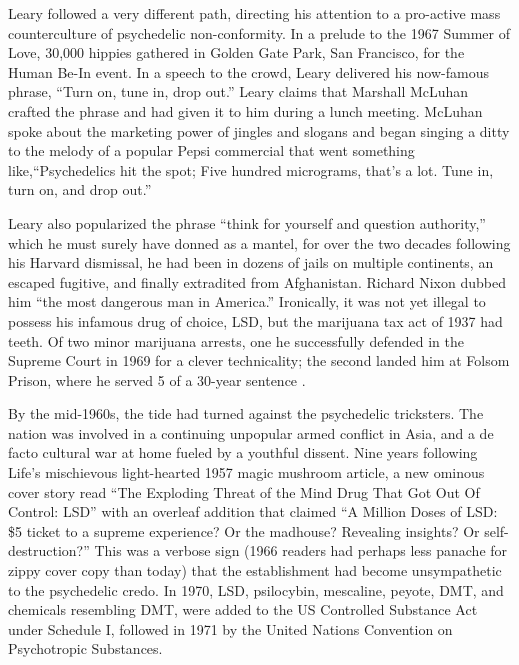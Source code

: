 \documentclass{UIdahoMastersThesis}
\begin{document}
Leary followed a very different path, directing his attention to a pro-active mass counterculture of psychedelic non-conformity. In a prelude to the 1967 Summer of Love, 30,000 hippies gathered in Golden Gate Park, San Francisco, for the Human Be-In event. In a speech to the crowd, Leary delivered his now-famous phrase, ``Turn on, tune in, drop out.'' Leary claims that Marshall McLuhan crafted the phrase and had given it to him during a lunch meeting. McLuhan spoke about the marketing power of jingles and slogans and began singing a ditty to the melody of a popular Pepsi commercial that went something like,\enquote{Psychedelics hit the spot; Five hundred micrograms, that's a lot. Tune in, turn on, and drop out.}

Leary also popularized the phrase ``think for yourself and question authority,'' which he must surely have donned as a mantel, for over the two decades following his Harvard dismissal, he had been in dozens of jails on multiple continents, an escaped fugitive, and finally extradited from Afghanistan. Richard Nixon dubbed him ``the most dangerous man in America.'' Ironically, it was not yet illegal to possess his infamous drug of choice, LSD, but the marijuana tax act of 1937 had teeth. Of two minor marijuana arrests, one he successfully defended in the Supreme Court in 1969 for a clever technicality; the second landed him at Folsom Prison, where he served 5 of a 30-year sentence \cite{higgs_i_2006}.

By the mid-1960s, the tide had turned against the psychedelic tricksters. The nation was involved in a continuing unpopular armed conflict in Asia, and a de facto cultural war at home fueled by a youthful dissent. Nine years following Life's mischievous light-hearted 1957 magic mushroom article, a new ominous cover story read \enquote{The Exploding Threat of the Mind Drug That Got Out Of Control: LSD} with an overleaf addition that claimed \enquote{A Million Doses of LSD: \$5 ticket to a supreme experience? Or the madhouse? Revealing insights? Or self-destruction?} This was a verbose sign (1966 readers had perhaps less panache for zippy cover copy than today) that the establishment had become unsympathetic to the psychedelic credo. In 1970, LSD, psilocybin, mescaline, peyote, DMT, and chemicals resembling DMT, were added to the US Controlled Substance Act under Schedule I, followed in 1971 by the United Nations Convention on Psychotropic Substances. 

\noindent
{%
\setlength{\fboxsep}{0pt}%
\setlength{\fboxrule}{1.5pt}%
%
}%
\end{document}
